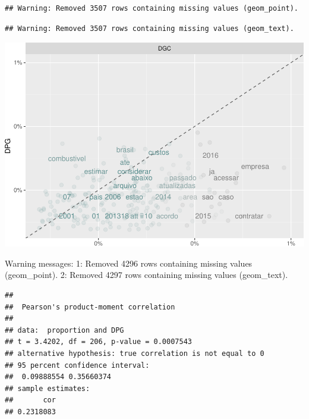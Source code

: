 \documentclass[]{article}
\newenvironment{Shaded}{\begin{snugshade}}{\end{snugshade}}
\newcommand{\KeywordTok}[1]{\textcolor[rgb]{0.13,0.29,0.53}{\textbf{#1}}}
\newcommand{\DataTypeTok}[1]{\textcolor[rgb]{0.13,0.29,0.53}{#1}}
\newcommand{\StringTok}[1]{\textcolor[rgb]{0.31,0.60,0.02}{#1}}
\newcommand{\FunctionTok}[1]{\textcolor[rgb]{0.00,0.00,0.00}{#1}}
\newcommand{\OperatorTok}[1]{\textcolor[rgb]{0.81,0.36,0.00}{\textbf{#1}}}
\newcommand{\AttributeTok}[1]{\textcolor[rgb]{0.77,0.63,0.00}{#1}}
\newcommand{\NormalTok}[1]{#1}
\begin{document}
\begin{verbatim}
## Warning: Removed 3507 rows containing missing values (geom_point).
\end{verbatim}

\begin{verbatim}
## Warning: Removed 3507 rows containing missing values (geom_text).
\end{verbatim}

\includegraphics{markdown_v31_files/figure-latex/unnamed-chunk-67-1.pdf}

\begin{Shaded}
\begin{Highlighting}[]
\FunctionTok{Warning messages:}
\FunctionTok{1:}\AttributeTok{ Removed 4296 rows containing missing values (geom_point). }
\FunctionTok{2:}\AttributeTok{ Removed 4297 rows containing missing values (geom_text). }
\end{Highlighting}
\end{Shaded}

\begin{Shaded}
\end{Shaded}

\begin{verbatim}
## 
##  Pearson's product-moment correlation
## 
## data:  proportion and DPG
## t = 3.4202, df = 206, p-value = 0.0007543
## alternative hypothesis: true correlation is not equal to 0
## 95 percent confidence interval:
##  0.09888554 0.35660374
## sample estimates:
##       cor 
## 0.2318083
\end{verbatim}
\end{document}
